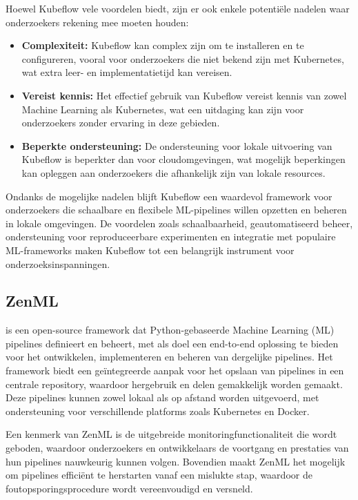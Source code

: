 Hoewel Kubeflow vele voordelen biedt, zijn er ook enkele potentiële nadelen waar onderzoekers rekening mee moeten houden:
\begin{itemize}
    \item \textbf{Complexiteit:} Kubeflow kan complex zijn om te installeren en te configureren, vooral voor onderzoekers die niet bekend zijn met Kubernetes, wat extra leer- en implementatietijd kan vereisen.
    \item \textbf{Vereist kennis:} Het effectief gebruik van Kubeflow vereist kennis van zowel Machine Learning als Kubernetes, wat een uitdaging kan zijn voor onderzoekers zonder ervaring in deze gebieden.
    \item \textbf{Beperkte ondersteuning:} De ondersteuning voor lokale uitvoering van Kubeflow is beperkter dan voor cloudomgevingen, wat mogelijk beperkingen kan opleggen aan onderzoekers die afhankelijk zijn van lokale resources.
\end{itemize}

Ondanks de mogelijke nadelen blijft Kubeflow een waardevol framework voor onderzoekers die schaalbare en flexibele ML-pipelines willen opzetten en beheren in lokale omgevingen. De voordelen zoals schaalbaarheid, geautomatiseerd beheer, ondersteuning voor reproduceerbare experimenten en integratie met populaire ML-frameworks maken Kubeflow tot een belangrijk instrument voor onderzoeksinspanningen.

\subsection{ZenML}

\textcite{ZenML2024} is een open-source framework dat Python-gebaseerde Machine Learning (ML) pipelines definieert en beheert, met als doel een end-to-end oplossing te bieden voor het ontwikkelen, implementeren en beheren van dergelijke pipelines. Het framework biedt een geïntegreerde aanpak voor het opslaan van pipelines in een centrale repository, waardoor hergebruik en delen gemakkelijk worden gemaakt. Deze pipelines kunnen zowel lokaal als op afstand worden uitgevoerd, met ondersteuning voor verschillende platforms zoals Kubernetes en Docker.

Een kenmerk van ZenML is de uitgebreide monitoringfunctionaliteit die wordt geboden, waardoor onderzoekers en ontwikkelaars de voortgang en prestaties van hun pipelines nauwkeurig kunnen volgen. Bovendien maakt ZenML het mogelijk om pipelines efficiënt te herstarten vanaf een mislukte stap, waardoor de foutopsporingsprocedure wordt vereenvoudigd en versneld.

